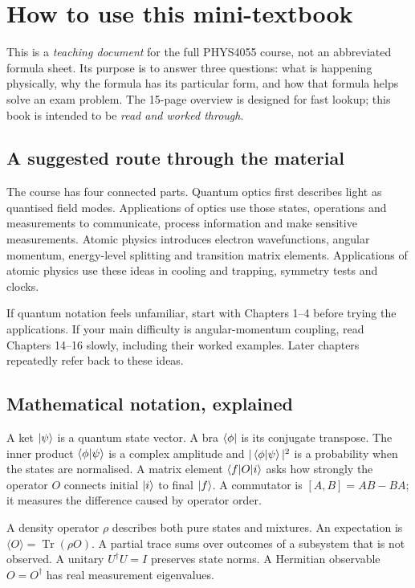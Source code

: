 \section*{How to use this mini-textbook}
This is a \emph{teaching document} for the full PHYS4055
course, not an abbreviated formula sheet.
Its purpose is to answer three questions:
what is happening physically, why the formula
has its particular form, and how that formula
helps solve an exam problem.
The 15-page overview is designed for fast lookup;
this book is intended to be \emph{read and worked through}.

\subsection*{A suggested route through the material}
The course has four connected parts.
Quantum optics first describes light as quantised
field modes. Applications of optics use those
states, operations and measurements to
communicate, process information and make
sensitive measurements. Atomic physics
introduces electron wavefunctions, angular
momentum, energy-level splitting and transition
matrix elements. Applications of atomic physics
use these ideas in cooling and trapping,
symmetry tests and clocks.

If quantum notation feels unfamiliar, start
with Chapters 1--4 before trying the
applications. If your main difficulty is
angular-momentum coupling, read Chapters
14--16 slowly, including their worked
examples. Later chapters repeatedly
refer back to these ideas.

\subsection*{Mathematical notation, explained}
A ket \(\left\lvert \psi\right\rangle\) is a quantum state vector.
A bra \(\left\langle \phi\right\rvert\) is its conjugate transpose.
The inner product \(\left\langle \phi\middle\vert \psi\right\rangle\)
is a complex amplitude and
\(|\left\langle \phi\middle\vert \psi\right\rangle|^2\) is a probability
when the states are normalised.
A matrix element \(\left\langle f\middle\vert O\middle\vert i\right\rangle\) asks
how strongly the operator \(O\)
connects initial \(\left\lvert i\right\rangle\) to final
\(\left\lvert f\right\rangle\). A commutator is
\([A,B]=AB-BA\); it measures
the difference caused by operator order.

A density operator \(\rho\) describes
both pure states and mixtures.
An expectation is
\(\langle O\rangle=\operatorname{Tr}(\rho O)\).
A partial trace sums over outcomes
of a subsystem that is not observed.
A unitary \(U^\dagger U=I\)
preserves state norms.
A Hermitian observable \(O=O^\dagger\)
has real measurement eigenvalues.

